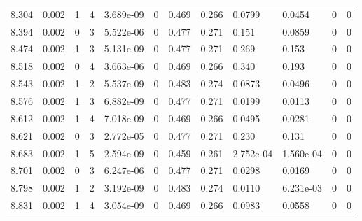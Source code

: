 \documentclass[preview]{standalone}
\begin{document}
{{{\begin{tabular}{L{1.2cm}C{1.2cm} C{0.3cm}C{0.5cm} C{1.4cm}C{1.4cm} C{1.4cm}C{1.4cm} C{1.6cm}C{1.6cm} C{1.6cm}C{1.6cm}}
  8.304  &  0.002  & 1     &  4 &  3.689e-09  & 0  &  0.469&   0.266& 0.0799 & 0.0454   &  0 & 0  \\ 
  8.394  &  0.002  & 0     &  3 &  5.522e-06  & 0  &  0.477&   0.271& 0.151 & 0.0859   &  0 & 0  \\ 
  8.474  &  0.002  & 1     &  3 &  5.131e-09  & 0  &  0.477&   0.271& 0.269 & 0.153   &  0 & 0  \\ 
  8.518  &  0.002  & 0     &  4 &  3.663e-06  & 0  &  0.469&   0.266& 0.340 & 0.193   &  0 & 0  \\ 
  8.543  &  0.002  & 1     &  2 &  5.537e-09  & 0  &  0.483&   0.274& 0.0873 & 0.0496   &  0 & 0  \\ 
  8.576  &  0.002  & 1     &  3 &  6.882e-09  & 0  &  0.477&   0.271& 0.0199 & 0.0113   &  0 & 0  \\ 
  8.612  &  0.002  & 1     &  4 &  7.018e-09  & 0  &  0.469&   0.266& 0.0495 & 0.0281   &  0 & 0  \\ 
  8.621  &  0.002  & 0     &  3 &  2.772e-05  & 0  &  0.477&   0.271& 0.230 & 0.131   &  0 & 0  \\ 
  8.683  &  0.002  & 1     &  5 &  2.594e-09  & 0  &  0.459&   0.261& 2.752e-04 & 1.560e-04   &  0 & 0  \\ 
  8.701  &  0.002  & 0     &  3 &  6.247e-06  & 0  &  0.477&   0.271& 0.0298 & 0.0169   &  0 & 0  \\ 
  8.798  &  0.002  & 1     &  2 &  3.192e-09  & 0  &  0.483&   0.274& 0.0110 & 6.231e-03   &  0 & 0  \\ 
  8.831  &  0.002  & 1     &  4 &  3.054e-09  & 0  &  0.469&   0.266& 0.0983 & 0.0558   &  0 & 0  \\ 
\hline 
\end{tabular} 

}}}
\end{document}
